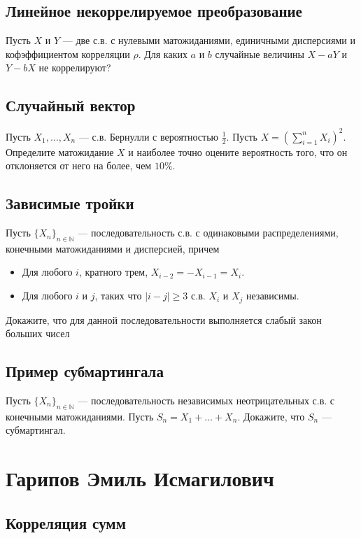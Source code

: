 \documentclass[12pt]{article}
\newcommand\N{\mathbb{N}}
\begin{document}
\subsection{Линейное некоррелируемое преобразование}

Пусть $X$ и $Y$ --- две с.в. с нулевыми матожиданиями, единичными дисперсиями и кофэффициентом корреляции $\rho$. Для каких $a$ и $b$ случайные величины $X - aY$ и $Y - bX$ не коррелируют?


\subsection{Случайный вектор}

Пусть $X_1, \dots, X_n$ --- с.в. Бернулли с вероятностью $\frac{1}{2}$. Пусть $X = (\sum_{i = 1}^n X_i)^2$. Определите матожидание $X$ и наиболее точно оцените вероятность того, что он отклоняется от него на более, чем $10\%$.


\subsection{Зависимые тройки}
Пусть $\{X_n\}_{n \in \N}$ --- последовательность с.в. с одинаковыми распределениями, конечными матожиданиями и дисперсией, причем
\begin{itemize}
    \item Для любого $i$, кратного трем, $X_{i - 2} = - X_{i - 1} = X_{i}$. 
    \item Для любого $i$ и $j$, таких что $|i - j| \ge 3$ с.в. $X_i$ и $X_j$ независимы.
\end{itemize}
Докажите, что для данной последовательности выполняется слабый закон больших чисел


\subsection{Пример субмартингала}

Пусть $\{X_n\}_{n \in \N}$ --- последовательность независимых неотрицательных с.в. с конечными матожиданиями. Пусть $S_n = X_1 + \dots + X_n$. Докажите, что $S_n$ --- субмартингал.

\newpage
\section{Гарипов Эмиль Исмагилович}

\subsection{Корреляция сумм}
\end{document}
